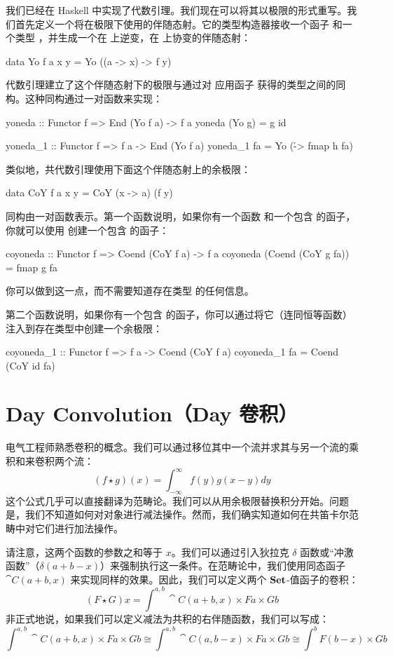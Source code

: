 \documentclass[DaoFP]{subfiles}
\begin{document}
 我们已经在 Haskell 中实现了代数引理。我们现在可以将其以极限的形式重写。我们首先定义一个将在极限下使用的伴随态射。它的类型构造器接收一个函子  和一个类型 ，并生成一个在  上逆变，在  上协变的伴随态射：
 \begin{haskell}
  data Yo f a x y = Yo ((a -> x) -> f y)
 \end{haskell}
 代数引理建立了这个伴随态射下的极限与通过对  应用函子  获得的类型之间的同构。这种同构通过一对函数来实现：
 \begin{haskell}
  yoneda :: Functor f => End (Yo f a) -> f a
  yoneda (Yo g) = g id

  yoneda_1 :: Functor f => f a -> End (Yo f a)
  yoneda_1 fa = Yo (\h -> fmap h fa)
 \end{haskell}

 类似地，共代数引理使用下面这个伴随态射上的余极限：
 \begin{haskell}
  data CoY f a x y = CoY (x -> a) (f y)
 \end{haskell}
 同构由一对函数表示。第一个函数说明，如果你有一个函数  和一个包含  的函子，你就可以使用  创建一个包含  的函子：
 \begin{haskell}
  coyoneda :: Functor f => Coend (CoY f a) -> f a
  coyoneda (Coend (CoY g fa)) = fmap g fa
 \end{haskell}
 你可以做到这一点，而不需要知道存在类型  的任何信息。

 第二个函数说明，如果你有一个包含  的函子，你可以通过将它（连同恒等函数）注入到存在类型中创建一个余极限：
 \begin{haskell}
  coyoneda_1 :: Functor f => f a -> Coend (CoY f a)
  coyoneda_1 fa = Coend (CoY id fa)
 \end{haskell}

 \section{Day Convolution（Day 卷积）}

 电气工程师熟悉卷积的概念。我们可以通过移位其中一个流并求其与另一个流的乘积和来卷积两个流：
 \[ (f \star g)(x) = \int^{\infty}_{-\infty} f(y) g(x - y) dy \]
 这个公式几乎可以直接翻译为范畴论。我们可以从用余极限替换积分开始。问题是，我们不知道如何对对象进行减法操作。然而，我们确实知道如何在共笛卡尔范畴中对它们进行加法操作。

 请注意，这两个函数的参数之和等于 $x$。我们可以通过引入狄拉克 $\delta$ 函数或“冲激函数”（$\delta(a + b - x)$）来强制执行这一条件。在范畴论中，我们使用同态函子 $\cat C (a + b, x)$ 来实现同样的效果。因此，我们可以定义两个 $\mathbf{Set}$-值函子的卷积：
 \[ (F \star G) x = \int^{a, b} \cat C (a + b, x) \times F a \times G b \]
 非正式地说，如果我们可以定义减法为共积的右伴随函数，我们可以写成：
 \[ \int^{a, b} \cat C (a + b, x) \times F a \times G b \cong \int^{a, b} \cat C (a, b - x) \times F a \times G b \cong \int^b F (b - x) \times G b\]
\end{document}
